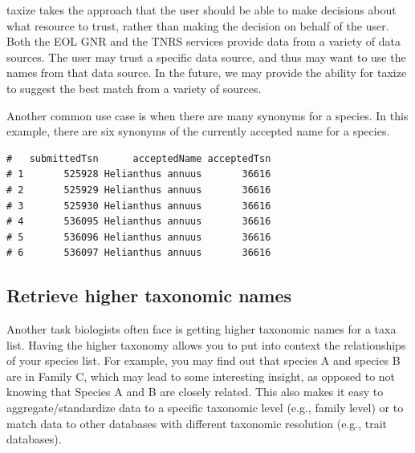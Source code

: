 \begin{sloppypar}
taxize takes the approach that the user should be able to make decisions about what resource to trust, rather than making the decision on behalf of the user. 
Both the EOL GNR and the TNRS services provide data from a variety of data sources. 
The user may trust a specific data source, and thus may want to use the names from that data source. 
In the future, we may provide the ability for taxize to suggest the best match from a variety of sources.

Another common use case is when there are many synonyms for a species. 
In this example, there are six synonyms of the currently accepted name for a species. 

\begin{knitrout}
\small
{}
\color{fgcolor}
\begin{kframe}
\begin{alltt}
 \hlkwb{<-} \hlstd{(}\hlstd{,}
             \hlstd{,}
             \hlstd{,}
             \hlstd{,}
             \hlstd{,}
             \hlstd{)}
 \hlkwb{<-} 
\end{alltt}
\begin{verbatim}
#   submittedTsn      acceptedName acceptedTsn
# 1       525928 Helianthus annuus       36616
# 2       525929 Helianthus annuus       36616
# 3       525930 Helianthus annuus       36616
# 4       536095 Helianthus annuus       36616
# 5       536096 Helianthus annuus       36616
# 6       536097 Helianthus annuus       36616
\end{verbatim}
\end{kframe}
\end{knitrout}


\subsection{Retrieve higher taxonomic names}
Another task biologists often face is getting higher taxonomic names for a taxa list. 
Having the higher taxonomy allows you to put into context the relationships of your species list. 
For example, you may find out that species A and species B are in Family C, which may lead to some interesting insight, as opposed to not knowing that Species A and B are closely related.
 This also makes it easy to aggregate/standardize data to a specific taxonomic level (e.g., family level) or to match data to other databases with different taxonomic resolution (e.g., trait databases).


\end{sloppypar}
